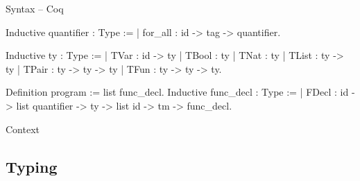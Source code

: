 \documentclass{beamer}
\begin{document}
\begin{frame}[fragile]{Syntax -- Coq}
\begin{coqcode}
Inductive quantifier : Type :=
  | for_all : id -> tag -> quantifier.
	
Inductive ty : Type :=
  | TVar  : id -> ty
  | TBool : ty
  | TNat  : ty
  | TList : ty -> ty
  | TPair : ty -> ty -> ty
  | TFun  : ty -> ty -> ty.

Definition program := list func_decl.
Inductive func_decl : Type :=
  | FDecl : id -> list quantifier ->
	ty -> list id -> tm -> func_decl.
\end{coqcode}
\end{frame}
\begin{frame}{Context}
\end{frame}
\subsection{Typing}
\end{document}
